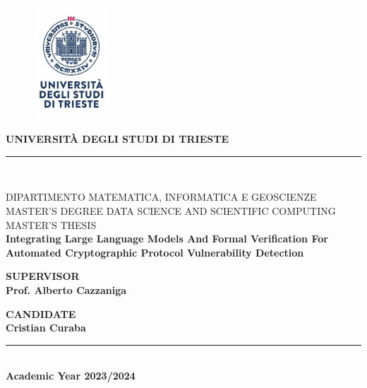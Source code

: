 \documentclass[a4paper,12pt,twoside,openany]{book}
\begin{document}
\begin{titlepage}

\begin{center}
\begin{figure}
    \centering
	\includegraphics[width=0.25\textwidth]{Figures/logo_units.jpg}
\end{figure}

\large{\bf UNIVERSIT\`A DEGLI STUDI DI TRIESTE}\\
\rule[0.2cm]{10cm}{0.4mm} \\
\end{center}
\begin{center}
    \large{DIPARTIMENTO MATEMATICA, INFORMATICA E GEOSCIENZE}\\
    \vspace{4mm}
    \large{ MASTER'S DEGREE DATA SCIENCE AND SCIENTIFIC COMPUTING}\\
    \vspace{20mm}
    \Large{MASTER'S THESIS}\\
    \vspace{10mm}
    \Large{\bf Integrating Large Language Models And Formal Verification For Automated Cryptographic Protocol Vulnerability Detection}
	\vspace{5mm}	
\end{center}
\vspace{30mm}
\par
\noindent
\begin{minipage}[t]{0.55\textwidth}
{\large{\bf SUPERVISOR\\ Prof. Alberto Cazzaniga\\
}}
\end{minipage}
\hfill
\begin{minipage}[t]{0.45\textwidth}\raggedleft
{\large{\bf CANDIDATE\\
Cristian Curaba}}
\end{minipage}
\vspace{15mm}
\begin{center}
\rule[0.3cm]{10cm}{0.4mm} \\
{\large{\bf Academic Year 2023/2024}}
\end{center}
\end{titlepage}
\end{document}
